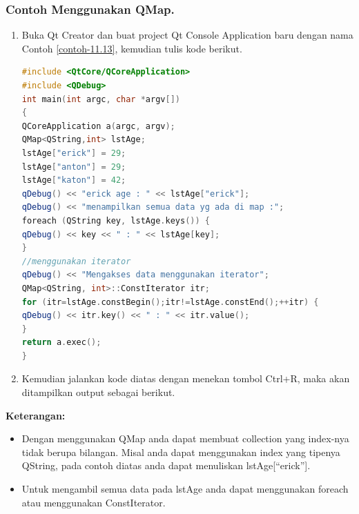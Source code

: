 \subsubsection*{Contoh  Menggunakan QMap.}

\begin{enumerate}

\item
  Buka Qt Creator dan buat project Qt Console Application baru dengan
  nama Contoh \ref{contoh-11.13}, kemudian tulis kode berikut.

\begin{lstlisting}[language=c++, caption=Menggunakan QMap, label=contoh-11.13]
#include <QtCore/QCoreApplication>
#include <QDebug>
int main(int argc, char *argv[])
{
QCoreApplication a(argc, argv);
QMap<QString,int> lstAge;
lstAge["erick"] = 29;
lstAge["anton"] = 29;
lstAge["katon"] = 42;
qDebug() << "erick age : " << lstAge["erick"];
qDebug() << "menampilkan semua data yg ada di map :";
foreach (QString key, lstAge.keys()) {
qDebug() << key << " : " << lstAge[key];
}
//menggunakan iterator
qDebug() << "Mengakses data menggunakan iterator";
QMap<QString, int>::ConstIterator itr;
for (itr=lstAge.constBegin();itr!=lstAge.constEnd();++itr) {
qDebug() << itr.key() << " : " << itr.value();
}
return a.exec();
}
\end{lstlisting}
\item
  Kemudian jalankan kode diatas dengan menekan tombol Ctrl+R, maka akan
  ditampilkan output sebagai berikut.
\end{enumerate}

\textbf{Keterangan:}

\begin{itemize}

\item
  Dengan menggunakan QMap anda dapat membuat collection yang index-nya
  tidak berupa bilangan. Misal anda dapat menggunakan index yang tipenya
  QString, pada contoh diatas anda dapat menuliskan
  lstAge{[}``erick''{]}.
\item
  Untuk mengambil semua data pada lstAge anda dapat menggunakan foreach
  atau menggunakan ConstIterator.
\end{itemize}

